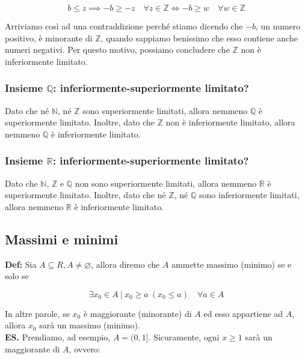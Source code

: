 \documentclass{article}
\begin{document}
\begin{equation*}
    b \leq z \implies -b \geq -z \quad \forall z \in \mathbb{Z} \iff -b \geq w \quad \forall w \in \mathbb{Z}
\end{equation*}

\noindent Arriviamo così ad una contraddizione perché stiamo dicendo che $-b$, un numero positivo, è minorante di $\mathbb{Z}$, quando sappiamo benissimo che esso contiene anche numeri negativi. Per questo motivo, possiamo concludere che $\mathbb{Z}$ non è inferiormente limitato.

\subsubsection{Insieme $\mathbb{Q}$: inferiormente-superiormente limitato?}
Dato che né $\mathbb{N}$, né $\mathbb{Z}$ sono superiormente limitati, allora nemmeno $\mathbb{Q}$ è superiormente limitato. Inoltre, dato che $\mathbb{Z}$ non è inferiormente limitato, allora nemmeno $\mathbb{Q}$ è inferiormente limitato.

\subsubsection{Insieme $\mathbb{R}$: inferiormente-superiormente limitato?}
Dato che $\mathbb{N}$, $\mathbb{Z}$ e $\mathbb{Q}$ non sono superiormente limitati, allora nemmeno $\mathbb{R}$ è superiormente limitato. Inoltre, dato che né $\mathbb{Z}$, né $\mathbb{Q}$ sono inferiormente limitati, allora nemmeno $\mathbb{R}$ è inferiormente limitato.

\subsection{Massimi e minimi}
\textbf{Def:} Sia $A \subseteq R, A \neq \varnothing$, allora diremo che $A$ ammette massimo (minimo) se e solo se

\begin{equation*}
    \exists x_0 \in A \ | \ x_0 \geq a \ (x_0 \leq a) \quad \forall a \in A
\end{equation*}

\noindent In altre parole, se $x_0$ è maggiorante (minorante) di $A$ ed esso appartiene ad $A$, allora $x_0$ sarà un massimo (minimo).\\

\noindent\textbf{ES.} Prendiamo, ad esempio, $A = (0, 1]$. Sicuramente, ogni $x \geq 1$ sarà un maggiorante di $A$, ovvero:
\end{document}
